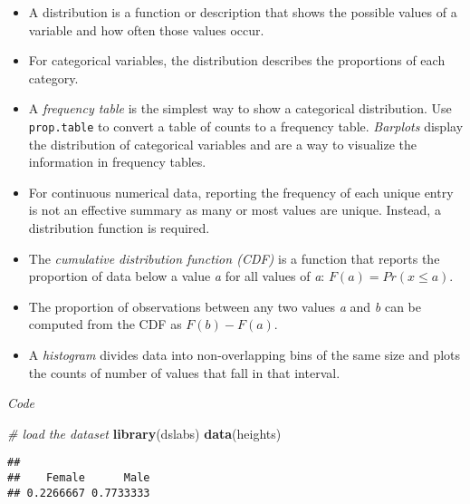 \documentclass[]{article}
\newenvironment{Shaded}{\begin{snugshade}}{\end{snugshade}}
\newcommand{\CommentTok}[1]{\textcolor[rgb]{0.56,0.35,0.01}{\textit{#1}}}
\newcommand{\KeywordTok}[1]{\textcolor[rgb]{0.13,0.29,0.53}{\textbf{#1}}}
\newcommand{\NormalTok}[1]{#1}
\newcommand{\OperatorTok}[1]{\textcolor[rgb]{0.81,0.36,0.00}{\textbf{#1}}}
\providecommand{\tightlist}{%
  \setlength{\itemsep}{0pt}\setlength{\parskip}{0pt}}
\begin{document}
\begin{itemize}
\tightlist
\item
  A distribution is a function or description that shows the possible
  values of a variable and how often those values occur.
\item
  For categorical variables, the distribution describes the proportions
  of each category.
\item
  A \emph{frequency table} is the simplest way to show a categorical
  distribution. Use \texttt{prop.table} to convert a table of counts to
  a frequency table. \emph{Barplots} display the distribution of
  categorical variables and are a way to visualize the information in
  frequency tables.
\item
  For continuous numerical data, reporting the frequency of each unique
  entry is not an effective summary as many or most values are unique.
  Instead, a distribution function is required.
\item
  The \emph{cumulative distribution function (CDF)} is a function that
  reports the proportion of data below a value \emph{a} for all values
  of \emph{a}: \(F(a) = Pr(x \le a)\).
\item
  The proportion of observations between any two values \emph{a} and
  \emph{b} can be computed from the CDF as \(F(b) - F(a)\).
\item
  A \emph{histogram} divides data into non-overlapping bins of the same
  size and plots the counts of number of values that fall in that
  interval.
\end{itemize}

\emph{Code}

\begin{Shaded}
\begin{Highlighting}[]
\CommentTok{# load the dataset}
\KeywordTok{library}\NormalTok{(dslabs)}
\KeywordTok{data}\NormalTok{(heights)}
\end{Highlighting}
\end{Shaded}

\begin{Shaded}
\end{Shaded}

\begin{verbatim}
## 
##    Female      Male 
## 0.2266667 0.7733333
\end{verbatim}
\end{document}
